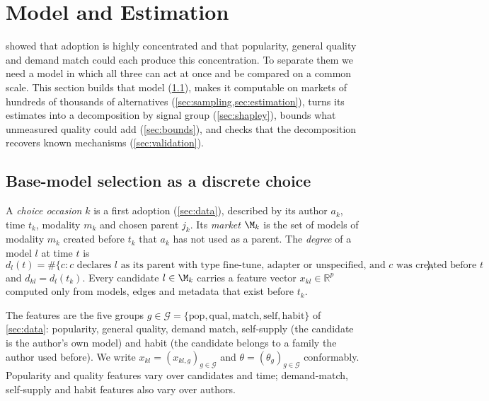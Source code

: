 \section{Model and Estimation}
\label{sec:method}

 showed that adoption is highly concentrated and that popularity, general quality and demand match
could each produce this concentration. To separate them we need a model in which all three can act at once and be
compared on a common scale. This section builds that model (\cref{sec:choice}), makes it computable on markets of
hundreds of thousands of alternatives (\cref{sec:sampling,sec:estimation}), turns its estimates into a
decomposition by signal group (\cref{sec:shapley}), bounds what unmeasured quality could add (\cref{sec:bounds}),
and checks that the decomposition recovers known mechanisms (\cref{sec:validation}).

\subsection{Base-model selection as a discrete choice}
\label{sec:choice}

\begin{definition}
\label{def:occasion}
A \emph{choice occasion} $k$ is a first adoption (\cref{sec:data}), described by its author $a_k$, time $t_k$,
modality $m_k$ and chosen parent $j_k$. Its \emph{market} $\M_k$ is the set of models of modality $m_k$ created
before $t_k$ that $a_k$ has not used as a parent. The \emph{degree} of a model $l$ at time $t$ is
\[
  d_l(t) = \#\{c : \text{$c$ declares $l$ as its parent with type fine-tune, adapter or unspecified, and $c$ was
  created before $t$}\},
\]
and $d_{kl} = d_l(t_k)$. Every candidate $l \in \M_k$ carries a feature vector $x_{kl} \in \mathbb{R}^p$ computed
only from models, edges and metadata that exist before $t_k$.
\end{definition}

The features are the five groups $g \in \mathcal G = \{\text{pop}, \text{qual}, \text{match}, \text{self},
\text{habit}\}$ of \cref{sec:data}: popularity, general quality, demand match, self-supply (the candidate is the
author's own model) and habit (the candidate belongs to a family the author used before). We write $x_{kl} =
(x_{kl,g})_{g \in \mathcal G}$ and $\theta = (\theta_g)_{g \in \mathcal G}$ conformably. Popularity and quality
features vary over candidates and time; demand-match, self-supply and habit features also vary over authors.

